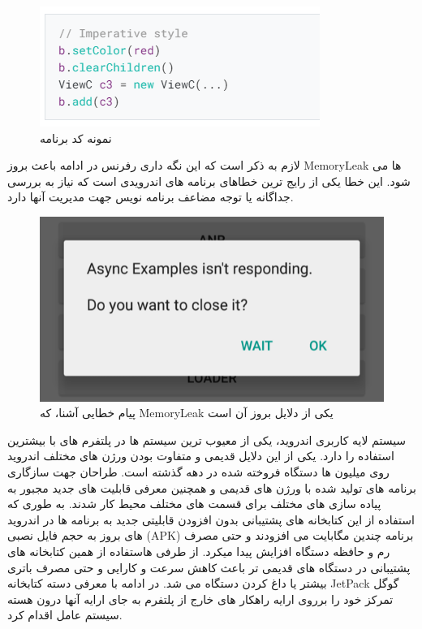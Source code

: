 \documentclass{CSICC2020}
\begin{document}
\begin{figure}[!h]
\includegraphics[width=\linewidth]{Images/android}
\caption{نمونه کد برنامه }
\label{fig:Android}
\end{figure}

لازم به ذکر است که این نگه داری رفرنس در ادامه باعث بروز MemoryLeak ها می شود. این خطا یکی از رایج ترین خطاهای برنامه های اندرویدی است که نیاز به بررسی جداگانه یا توجه مضاعف برنامه نویس جهت مدیریت آنها دارد. 
\cite{androidavoidmemleak}
\cite{androidmemleak}

\begin{figure}[!h]
\includegraphics[width=\linewidth]{Images/android-error}
\caption{پیام خطایی آشنا، که MemoryLeak یکی از دلایل بروز آن است}
\label{fig:Android}
\end{figure}

سیستم لایه کاربری اندروید، یکی از معیوب ترین سیستم ها در پلتفرم های با بیشترین استفاده را دارد. یکی از این دلایل قدیمی و متفاوت بودن ورژن های مختلف اندروید روی میلیون ها دستگاه فروخته شده در دهه گذشته است. طراحان جهت سازگاری برنامه های تولید شده با ورژن های قدیمی و همچنین معرفی قابلیت های جدید مجبور به پیاده سازی  های مختلف برای قسمت های مختلف محیط کار شدند. به طوری که استفاده از این کتابخانه های پشتیبانی بدون افزودن قابلیتی جدید به برنامه ها در اندروید های بروز به حجم فایل نصبی (APK) برنامه چندین مگابایت می افزودند و حتی مصرف رم و حافظه دستگاه افزایش پیدا میکرد. از طرفی هاستفاده از همین کتابخانه های پشتیبانی در دستگاه های قدیمی تر باعث کاهش سرعت و کارایی و حتی مصرف باتری بیشتر یا داغ کردن دستگاه می شد.
در ادامه با معرفی دسته کتابخانه JetPack گوگل تمرکز خود را برروی ارایه راهکار های خارج از پلتفرم به جای ارایه آنها درون هسته سیستم عامل اقدام کرد.
\cite{androidjetpack}
\end{document}
